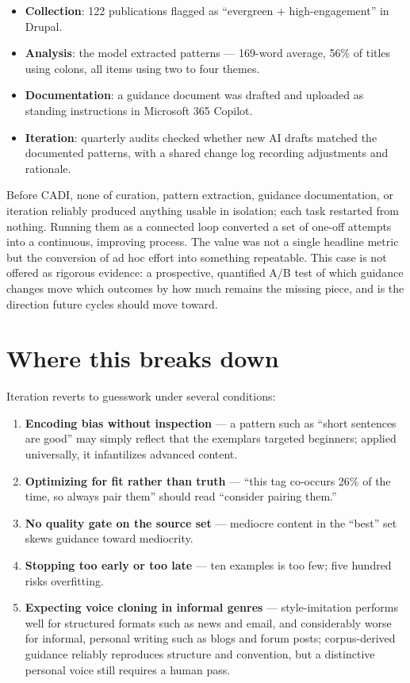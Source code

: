 \documentclass[11pt]{article}
\begin{document}
\begin{itemize}[nosep]
  \item \textbf{Collection}: 122 publications flagged as
        ``evergreen + high-engagement'' in Drupal.
  \item \textbf{Analysis}: the model extracted patterns --- 169-word
        average, 56\% of titles using colons, all items using two to
        four themes.
  \item \textbf{Documentation}: a guidance document was drafted and
        uploaded as standing instructions in Microsoft 365 Copilot.
  \item \textbf{Iteration}: quarterly audits checked whether new AI
        drafts matched the documented patterns, with a shared change
        log recording adjustments and rationale.
\end{itemize}

Before CADI, none of curation, pattern extraction, guidance
documentation, or iteration reliably produced anything usable in
isolation; each task restarted from nothing. Running them as a
connected loop converted a set of one-off attempts into a continuous,
improving process. The value was not a single headline metric but the
conversion of ad hoc effort into something repeatable. This case is
not offered as rigorous evidence: a prospective, quantified A/B test
of which guidance changes move which outcomes by how much remains the
missing piece, and is the direction future cycles should move toward.

\section{Where this breaks down}

Iteration reverts to guesswork under several conditions:

\begin{enumerate}[nosep]
  \item \textbf{Encoding bias without inspection} --- a pattern such
        as ``short sentences are good'' may simply reflect that the
        exemplars targeted beginners; applied universally, it
        infantilizes advanced content.
  \item \textbf{Optimizing for fit rather than truth} --- ``this tag
        co-occurs 26\% of the time, so always pair them'' should read
        ``consider pairing them.''
  \item \textbf{No quality gate on the source set} --- mediocre
        content in the ``best'' set skews guidance toward mediocrity.
  \item \textbf{Stopping too early or too late} --- ten examples is
        too few; five hundred risks overfitting.
  \item \textbf{Expecting voice cloning in informal genres} ---
        style-imitation performs well for structured formats such as
        news and email, and considerably worse for informal, personal
        writing such as blogs and forum posts; corpus-derived guidance
        reliably reproduces structure and convention, but a
        distinctive personal voice still requires a human pass.
\end{enumerate}
\end{document}
